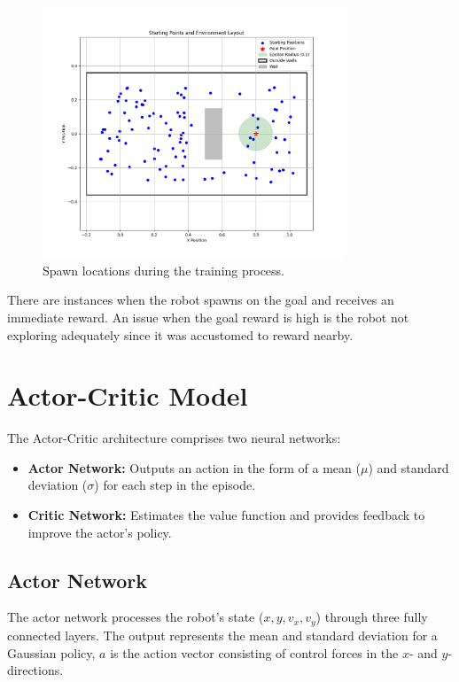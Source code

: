 \documentclass[12pt]{article}
\begin{document}
\begin{figure}[H]
    \centering
    \includegraphics[width=0.8\textwidth]{report/images/environment.png}
    \caption{Spawn locations during the training process.}
    \label{fig:trajectory}
\end{figure}

There are instances when the robot spawns on the goal and receives an immediate reward. An issue when the goal reward is high is the robot not exploring adequately since it was accustomed to reward nearby.

\section{Actor-Critic Model}


The Actor-Critic architecture comprises two neural networks:
\begin{itemize}
    \item \textbf{Actor Network:} Outputs an action in the form of a mean (\(\mu\)) and standard deviation (\(\sigma\)) for each step in the episode.
    \item \textbf{Critic Network:} Estimates the value function and provides feedback to improve the actor's policy.
\end{itemize}

\subsection{Actor Network}
The actor network processes the robot's state (\(x, y, v_x, v_y\)) through three fully connected layers. The output represents the mean and standard deviation for a Gaussian policy, \(a\) is the action vector consisting of control forces in the \(x\)- and \(y\)-directions.
\end{document}
